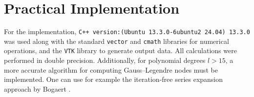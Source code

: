 \documentclass[a4paper,12pt]{paper}
\begin{document}
\clearpage
\section{Practical Implementation}
For the implementation, \texttt{C++ version:(Ubuntu 13.3.0-6ubuntu2~24.04) 13.3.0} was used along with the standard \texttt{vector} and \texttt{cmath} libraries for numerical operations, and the \texttt{VTK} library to generate output data. All calculations were performed in double precision. Additionally, for polynomial degrees \( l > 15 \), a more accurate algorithm for computing Gauss–Legendre nodes must be implemented. One can use for example the iteration-free series expansion approach by Bogaert \cite{BogaertLegendre}. \\
\end{document}
